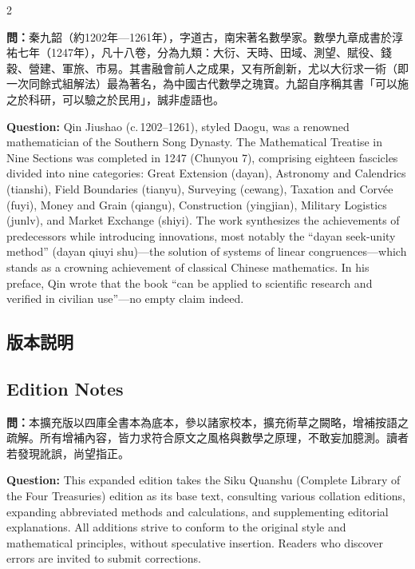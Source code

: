 \documentclass[11pt,a4paper]{article}
\newcommand{\QuestionText}[1]{\par\noindent\textbf{\color{problemcolor}問：}#1\par}
\newcommand{\QuestionEn}[1]{\par\noindent\textbf{\color{problemcolor}Question:} #1\par}
\begin{document}
\begin{paracol}{2}
\QuestionText{秦九韶（約1202年—1261年），字道古，南宋著名數學家。數學九章成書於淳祐七年（1247年），凡十八卷，分為九類：大衍、天時、田域、測望、賦役、錢穀、營建、軍旅、市易。其書融會前人之成果，又有所創新，尤以大衍求一術（即一次同餘式組解法）最為著名，為中國古代數學之瑰寶。九韶自序稱其書「可以施之於科研，可以驗之於民用」，誠非虛語也。}
\switchcolumn
\QuestionEn{Qin Jiushao (c.\,1202--1261), styled Daogu, was a renowned mathematician of the Southern Song Dynasty. The Mathematical Treatise in Nine Sections was completed in 1247 (Chunyou 7), comprising eighteen fascicles divided into nine categories: Great Extension (dayan), Astronomy and Calendrics (tianshi), Field Boundaries (tianyu), Surveying (cewang), Taxation and Corv\'{e}e (fuyi), Money and Grain (qiangu), Construction (yingjian), Military Logistics (junlv), and Market Exchange (shiyi). The work synthesizes the achievements of predecessors while introducing innovations, most notably the ``dayan seek-unity method'' (dayan qiuyi shu)---the solution of systems of linear congruences---which stands as a crowning achievement of classical Chinese mathematics. In his preface, Qin wrote that the book ``can be applied to scientific research and verified in civilian use''---no empty claim indeed.}
\switchcolumn*

\subsection*{版本説明}
\switchcolumn
\subsection*{Edition Notes}
\switchcolumn*

\QuestionText{本擴充版以四庫全書本為底本，參以諸家校本，擴充術草之闕略，增補按語之疏解。所有增補內容，皆力求符合原文之風格與數學之原理，不敢妄加臆測。讀者若發現訛誤，尚望指正。}
\switchcolumn
\QuestionEn{This expanded edition takes the Siku Quanshu (Complete Library of the Four Treasuries) edition as its base text, consulting various collation editions, expanding abbreviated methods and calculations, and supplementing editorial explanations. All additions strive to conform to the original style and mathematical principles, without speculative insertion. Readers who discover errors are invited to submit corrections.}

\end{paracol}
\end{document}
